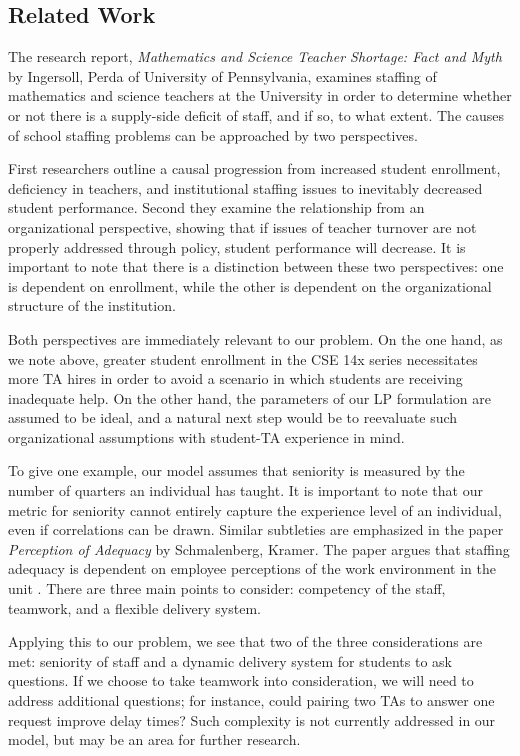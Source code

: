 \documentclass{article}
\begin{document}
\begin{multicols}{2}
\section*{Related Work}

The research report, \textit{Mathematics and Science Teacher Shortage: Fact and Myth} by Ingersoll, Perda of University of Pennsylvania, examines staffing of mathematics and science teachers at the University in order to determine whether or not there is a supply-side deficit of staff, and if so, to what extent\cite{ingersoll}. The causes of school staffing problems can be approached by two perspectives.

First researchers outline a causal progression from increased student enrollment, deficiency in teachers, and institutional staffing issues to inevitably decreased student performance. Second they examine the relationship from an organizational perspective, showing that if issues of teacher turnover are not properly addressed through policy, student performance will decrease. It is important to note that there is a distinction between these two perspectives: one is dependent on enrollment, while the other is dependent on the organizational structure of the institution. 

Both perspectives are immediately relevant to our problem. On the one hand, as we note above, greater student enrollment in the CSE 14x series necessitates more TA hires in order to avoid a scenario in which students are receiving inadequate help. On the other hand, the parameters of our LP formulation are assumed to be ideal, and a natural next step would be to reevaluate such organizational assumptions with student-TA experience in mind.

To give one example, our model assumes that seniority is measured by the number of quarters an individual has taught. It is important to note that our metric for seniority cannot entirely capture the experience level of an individual, even if correlations can be drawn. Similar subtleties are emphasized in the paper \textit{Perception of Adequacy} by Schmalenberg, Kramer. The paper argues that staffing adequacy is dependent on employee perceptions of the work environment in the unit \cite{schmalenberg}. There are three main points to consider: competency of the staff, teamwork, and a flexible delivery system.

Applying this to our problem, we see that two of the three considerations are met: seniority of staff and a dynamic delivery system for students to ask questions. If we choose to take teamwork into consideration, we will need to address additional questions; for instance, could pairing two TAs to answer one request improve delay times? Such complexity is not currently addressed in our model, but may be an area for further research.


\end{multicols}
\end{document}
